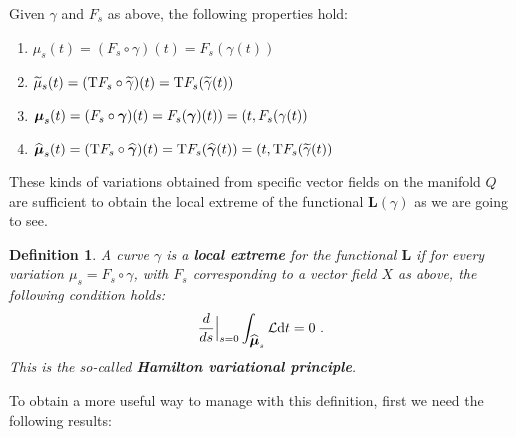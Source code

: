 \documentclass[12pt]{report}
\newtheorem{definition}[teor]{Definition}
\def\Lag{{\cal L}}
\def\d{{\rm d}}
\def\Tan{{\rm T}}
\begin{document}
Given $\gamma$ and $F_s$ as above, the following properties hold: 
\begin{enumerate}
\item $\mu_s(t)=(F_s\circ\gamma)(t)=F_s(\gamma(t))$
\item $\widetilde{\mu}_s (t)=(\Tan F_s\circ\widetilde{\gamma})(t)=\Tan F_s(\widetilde{\gamma}(t))$
\item ${\mbox{\boldmath$\mu$}}_s(t)=(F_s\circ\mbox{\boldmath$\gamma$})(t)=F_s(\mbox{\boldmath$\gamma$})(t))=(t,F_s(\gamma(t))$
\item $\widehat{\mbox{\boldmath$\mu$}}_s(t)=(\Tan F_s\circ\widehat{\mbox{\boldmath$\gamma$}})(t)=\Tan F_s(\widehat{\mbox{\boldmath$\gamma$}}(t))=(t,\Tan F_s(\widetilde{\gamma}(t))$
\end{enumerate}

These kinds of variations obtained from specific vector fields on the manifold $Q$ are sufficient to obtain the local extreme of the functional ${\mathbf L}(\gamma)$ as we are going to see.

\begin{definition}
A curve $\gamma$ is a \textbf{local extreme} for the functional ${\mathbf L}$
if for every variation $\mu_s= F_s\circ\gamma$, with $F_s$ corresponding to a vector field $X$ as above, the following condition holds:
$$
\frac{d}{d s}\Big\vert_{s=0}\int_{\widehat{\mbox{\boldmath$\mu$}}_s}\Lag\d t =0 \ .
$$
This is the so-called \textbf{Hamilton variational principle}.
\end{definition}

To obtain a more useful way to manage with this definition, first we need the following results:
\end{document}

